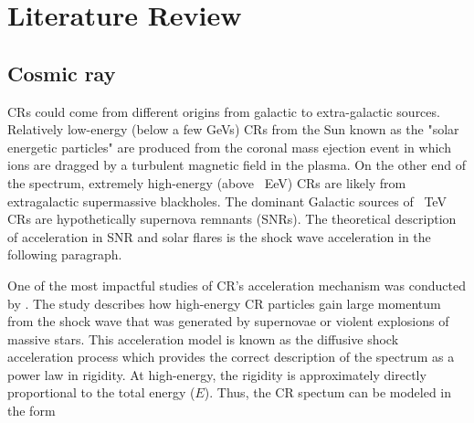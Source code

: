 \chapter{Literature Review}

\section{Cosmic ray}


CRs could come from different origins from galactic
to extra-galactic sources.
Relatively low-energy (below a few GeVs) CRs from the Sun known as
the "solar energetic particles" are produced from the coronal mass
ejection event in which ions are dragged by a turbulent magnetic
field in the plasma.
On the other end of the spectrum, extremely high-energy (above ~EeV)
CRs are likely from extragalactic supermassive blackholes.
The dominant Galactic sources of ~TeV CRs are hypothetically
supernova remnants (SNRs).
The theoretical description of acceleration in SNR and solar flares
is the shock wave acceleration in the following paragraph.

One of the most impactful studies of CR's acceleration mechanism 
was conducted by \cite{fermi1949origin}. 
The study describes how high-energy CR particles gain large
momentum from the shock wave that was generated by supernovae or
violent explosions of massive stars.
This acceleration model is known as the diffusive shock acceleration
process which provides the correct description of the spectrum as
a power law in rigidity. At high-energy, the rigidity is approximately
directly proportional to the total energy ($E$).
Thus, the CR spectum can be modeled in the form

